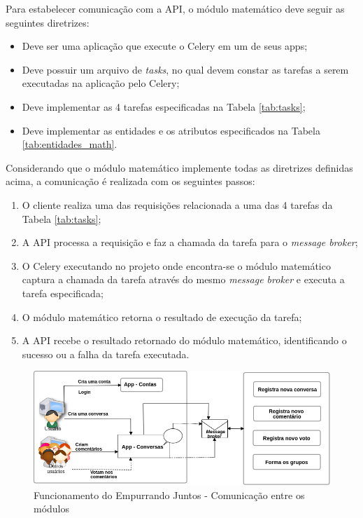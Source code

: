 Para estabelecer comunicação com a API, o módulo matemático deve seguir as seguintes diretrizes:
\begin{itemize}
  \item Deve ser uma aplicação que execute o Celery em um de seus apps;
  \item Deve possuir um arquivo de \textit{tasks}, no qual devem constar as tarefas a serem executadas na aplicação pelo Celery;
  \item Deve implementar as 4 tarefas especificadas na Tabela \ref{tab:tasks};
  \item Deve implementar as entidades e os atributos especificados na Tabela \ref{tab:entidades_math}.
\end{itemize}





Considerando que o módulo matemático implemente todas as diretrizes definidas acima, a comunicação é realizada com 
os seguintes passos:
  
\begin{enumerate}
 \item O cliente realiza uma das requisições relacionada a uma das 4 tarefas da Tabela \ref{tab:tasks};
 \item A API processa a requisição e faz a chamada da tarefa para o \textit{message broker};
 \item O Celery executando no projeto onde encontra-se o módulo matemático captura a chamada da tarefa através do mesmo \textit{message broker} e 
 executa a tarefa especificada;
 \item O módulo matemático retorna o resultado de execução da tarefa;
 \item A API recebe o resultado retornado do módulo matemático, identificando o sucesso ou a falha da tarefa executada.
\end{enumerate}

\vfill
\pagebreak
\begin{figure}[bt!]
\centering
\includegraphics[scale=0.6]{figuras/resumo_ej_api.png}
\caption{Funcionamento do Empurrando Juntos - Comunicação entre os módulos}
\label{fig:resumo_ej_api}
\end{figure}


